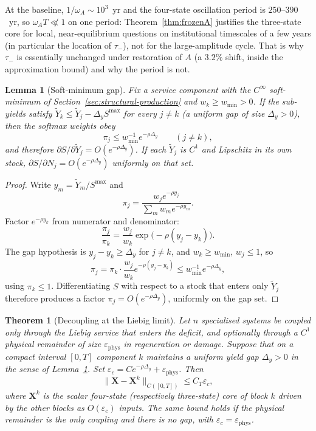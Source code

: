 \documentclass[11pt]{article}
\newtheorem{theorem}{Theorem}
\newtheorem{lemma}{Lemma}
\theoremstyle{definition}
\begin{document}
At the baseline, $1/\omega_A\sim 10^3$~yr and the four-state oscillation period is $250$--$390$~yr, so $\omega_A T\not\ll 1$ on one period: Theorem~\ref{thm:frozenA} justifies the three-state core for local, near-equilibrium questions on institutional timescales of a few years (in particular the location of $\tau_-$), not for the large-amplitude cycle. That is why $\tau_-$ is essentially unchanged under restoration of $A$ (a $3.2\%$ shift, inside the approximation bound) and why the period is not.

\begin{lemma}[Soft-minimum gap]
\label{lem:liebig-gap}
Fix a service component with the $C^\infty$ soft-minimum of Section~\ref{sec:structural-production} and $w_k\ge w_{\min}>0$. If the sub-yields satisfy $\tilde Y_k\le\tilde Y_j-\Delta_y S^{\max}$ for every $j\neq k$ (a uniform gap of size $\Delta_y>0$), then the softmax weights obey
\[
\pi_j\le w_{\min}^{-1}e^{-\rho\Delta_y}\qquad(j\neq k),
\]
and therefore $\partial S/\partial\tilde Y_j=O(e^{-\rho\Delta_y})$. If each $\tilde Y_j$ is $C^1$ and Lipschitz in its own stock, $\partial S/\partial N_j=O(e^{-\rho\Delta_y})$ uniformly on that set.
\end{lemma}

\begin{proof}
Write $y_m=\tilde Y_m/S^{\max}$ and
\[
\pi_j=\frac{w_j e^{-\rho y_j}}{\sum_m w_m e^{-\rho y_m}}.
\]
Factor $e^{-\rho y_k}$ from numerator and denominator:
\[
\frac{\pi_j}{\pi_k}=\frac{w_j}{w_k}\exp\bigl(-\rho(y_j-y_k)\bigr).
\]
The gap hypothesis is $y_j-y_k\ge\Delta_y$ for $j\neq k$, and $w_k\ge w_{\min}$, $w_j\le 1$, so
\[
\pi_j=\pi_k\cdot\frac{w_j}{w_k}e^{-\rho(y_j-y_k)}\le w_{\min}^{-1}e^{-\rho\Delta_y},
\]
using $\pi_k\le 1$. Differentiating $S$ with respect to a stock that enters only $\tilde Y_j$ therefore produces a factor $\pi_j=O(e^{-\rho\Delta_y})$, uniformly on the gap set.
\end{proof}

\begin{theorem}[Decoupling at the Liebig limit]
\label{thm:weak-coupling}
Let $n$ specialised systems be coupled only through the Liebig service that enters the deficit, and optionally through a $C^1$ physical remainder of size $\varepsilon_{\mathrm{phys}}$ in regeneration or damage. Suppose that on a compact interval $[0,T]$ component $k$ maintains a uniform yield gap $\Delta_y>0$ in the sense of Lemma~\ref{lem:liebig-gap}. Set $\varepsilon_c=C e^{-\rho\Delta_y}+\varepsilon_{\mathrm{phys}}$. Then
\[
\|\mathbf X-\mathbf X^k\|_{C([0,T])}\le C_T\varepsilon_c,
\]
where $\mathbf X^k$ is the scalar four-state (respectively three-state) core of block $k$ driven by the other blocks as $O(\varepsilon_c)$ inputs. The same bound holds if the physical remainder is the only coupling and there is no gap, with $\varepsilon_c=\varepsilon_{\mathrm{phys}}$.
\end{theorem}
\end{document}
